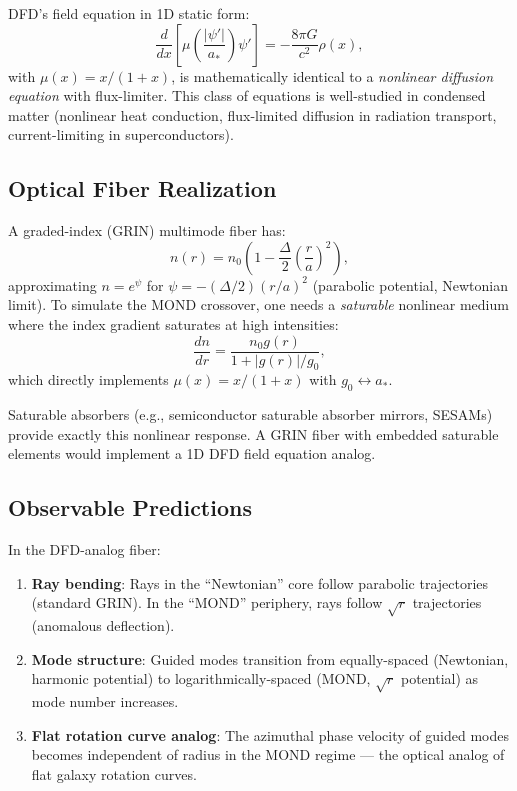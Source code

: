 \documentclass[11pt]{article}
\begin{document}
DFD's field equation in 1D static form:
\begin{equation}
\frac{d}{dx}\left[\mu\!\left(\frac{|\psi'|}{a_*}\right)\psi'\right]
= -\frac{8\pi G}{c^2}\rho(x),
\end{equation}
with $\mu(x) = x/(1+x)$, is mathematically identical to a
\emph{nonlinear diffusion equation} with flux-limiter. This class of
equations is well-studied in condensed matter (nonlinear heat
conduction, flux-limited diffusion in radiation transport,
current-limiting in superconductors).

\subsection{Optical Fiber Realization}

A graded-index (GRIN) multimode fiber has:
\begin{equation}
n(r) = n_0\left(1 - \frac{\Delta}{2}\left(\frac{r}{a}\right)^2\right),
\end{equation}
approximating $n = e^\psi$ for $\psi = -(\Delta/2)(r/a)^2$ (parabolic
potential, Newtonian limit). To simulate the MOND crossover, one needs
a \emph{saturable} nonlinear medium where the index gradient saturates
at high intensities:
\begin{equation}
\frac{dn}{dr} = \frac{n_0 g(r)}{1 + |g(r)|/g_0},
\end{equation}
which directly implements $\mu(x) = x/(1+x)$ with $g_0 \leftrightarrow a_*$.

Saturable absorbers (e.g., semiconductor saturable absorber mirrors,
SESAMs) provide exactly this nonlinear response. A GRIN fiber with
embedded saturable elements would implement a 1D DFD field equation
analog.

\subsection{Observable Predictions}

In the DFD-analog fiber:
\begin{enumerate}[nosep]
\item \textbf{Ray bending}: Rays in the ``Newtonian'' core follow
  parabolic trajectories (standard GRIN). In the ``MOND'' periphery,
  rays follow $\sqrt{r}$ trajectories (anomalous deflection).
\item \textbf{Mode structure}: Guided modes transition from
  equally-spaced (Newtonian, harmonic potential) to logarithmically-spaced
  (MOND, $\sqrt{r}$ potential) as mode number increases.
\item \textbf{Flat rotation curve analog}: The azimuthal phase velocity
  of guided modes becomes independent of radius in the MOND regime ---
  the optical analog of flat galaxy rotation curves.
\end{enumerate}
\end{document}
